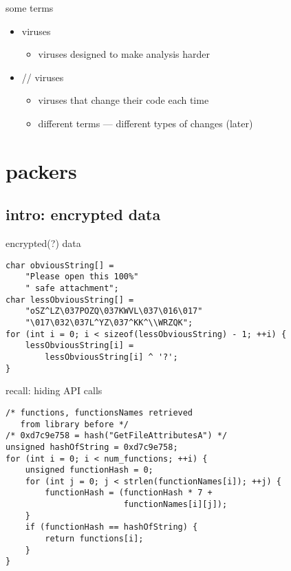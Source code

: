 \begin{frame}{some terms}
    \begin{itemize}
    \item {} viruses
        \begin{itemize}
        \item viruses designed to make analysis harder
        \end{itemize}
    \item {}// viruses
        \begin{itemize}
        \item viruses that change their code each time
        \item different terms --- different types of changes (later)
        \end{itemize}
    \end{itemize}
\end{frame}

\section{packers}

\subsection{intro: encrypted data}

\begin{frame}[fragile,label=encryptData]{encrypted(?) data}
\lstset{language=C,style=small}
\begin{lstlisting}
char obviousString[] =
    "Please open this 100%"
    " safe attachment";
char lessObviousString[] = 
    "oSZ^LZ\037POZQ\037KWVL\037\016\017"
    "\017\032\037L^YZ\037^KK^\\WRZQK";
for (int i = 0; i < sizeof(lessObviousString) - 1; ++i) {
    lessObviousString[i] =
        lessObviousString[i] ^ '?';
}
\end{lstlisting}
\end{frame}

\begin{frame}[fragile,label=recallHideAPI]{recall: hiding API calls}
\lstset{language=C,style=small}
\begin{lstlisting}
/* functions, functionsNames retrieved
   from library before */
/* 0xd7c9e758 = hash("GetFileAttributesA") */
unsigned hashOfString = 0xd7c9e758; 
for (int i = 0; i < num_functions; ++i) {
    unsigned functionHash = 0; 
    for (int j = 0; j < strlen(functionNames[i]); ++j) {
        functionHash = (functionHash * 7 +
                        functionNames[i][j]);
    }
    if (functionHash == hashOfString) {
        return functions[i];
    }
}
\end{lstlisting}
\end{frame}

